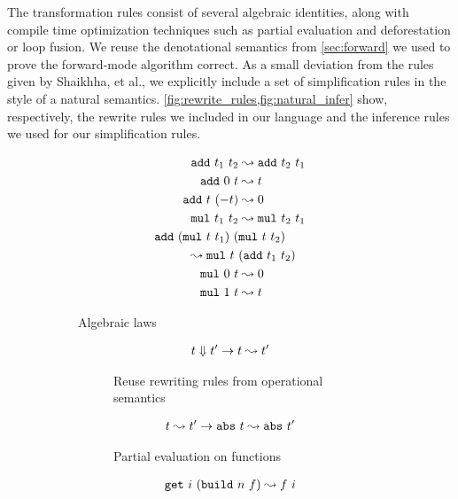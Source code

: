 The transformation rules consist of several algebraic identities, along with compile time optimization techniques such as partial evaluation and deforestation or loop fusion.
We reuse the denotational semantics from \cref{sec:forward} we used to prove the forward-mode algorithm correct.
As a small deviation from the rules given by Shaikhha, et al.\cite{Shaikha2019}, we explicitly include a set of simplification rules in the style of a natural semantics. \cref{fig:rewrite_rules,fig:natural_infer} show, respectively, the rewrite rules we included in our language and the inference rules we used for our simplification rules.

\begin{figure}[]
  \centering
  \begin{subfigure}{0.48\textwidth}
    \centering
    \begin{align*}
      \texttt{add}\ t_1\ t_2 &\leadsto \texttt{add}\ t_2\ t_1 \\
      \texttt{add}\ 0\ t &\leadsto t \\
      \texttt{add}\ t\ (-t) &\leadsto 0 \\
      \texttt{mul}\ t_1\ t_2 &\leadsto \texttt{mul}\ t_2\ t_1 \\
      \texttt{add}\ (\texttt{mul}\ t\ t_1)\ (&\texttt{mul}\ t\ t_2) \\
        \leadsto \texttt{mul}\ t\ &(\texttt{add}\ t_1\ t_2) \\
      \texttt{mul}\ 0\ t &\leadsto 0 \\
      \texttt{mul}\ 1\ t &\leadsto t
    \end{align*}
    \caption{Algebraic laws}
  \end{subfigure}
  \begin{subfigure}{0.48\textwidth}
    \begin{subfigure}{1\textwidth}
      \begin{align*}
        t \Downarrow t' \to t \leadsto t'
      \end{align*}
      \caption{Reuse rewriting rules from operational semantics}
    \end{subfigure}
    \begin{subfigure}{1\textwidth}
      \begin{align*}
        t \leadsto t' \to \texttt{abs}\ t \leadsto \texttt{abs}\ t'
      \end{align*}
      \caption{Partial evaluation on functions}
    \end{subfigure}
    \begin{subfigure}{1\textwidth}
      \begin{align*}
        \get{i}{(\build{n}{f})}\leadsto f\ i

\end{align*}
\end{subfigure}
\end{subfigure}
\end{figure}
